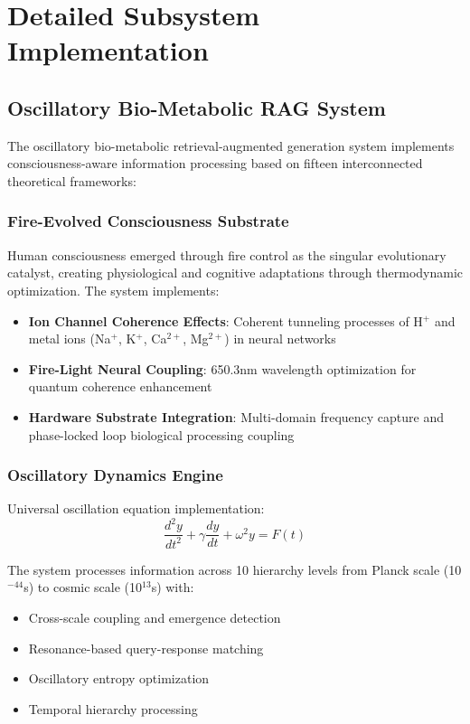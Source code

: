 \documentclass[11pt,a4paper]{article}
\begin{document}
\section{Detailed Subsystem Implementation}

\subsection{Oscillatory Bio-Metabolic RAG System}

The oscillatory bio-metabolic retrieval-augmented generation system implements consciousness-aware information processing based on fifteen interconnected theoretical frameworks:

\subsubsection{Fire-Evolved Consciousness Substrate}

Human consciousness emerged through fire control as the singular evolutionary catalyst, creating physiological and cognitive adaptations through thermodynamic optimization. The system implements:

\begin{itemize}
\item \textbf{Ion Channel Coherence Effects}: Coherent tunneling processes of H$^+$ and metal ions (Na$^+$, K$^+$, Ca$^{2+}$, Mg$^{2+}$) in neural networks
\item \textbf{Fire-Light Neural Coupling}: 650.3nm wavelength optimization for quantum coherence enhancement
\item \textbf{Hardware Substrate Integration}: Multi-domain frequency capture and phase-locked loop biological processing coupling
\end{itemize}

\subsubsection{Oscillatory Dynamics Engine}

Universal oscillation equation implementation:
\begin{equation}
\frac{d^2y}{dt^2} + \gamma\frac{dy}{dt} + \omega^2y = F(t)
\end{equation}

The system processes information across 10 hierarchy levels from Planck scale (10$^{-44}$s) to cosmic scale (10$^{13}$s) with:
\begin{itemize}
\item Cross-scale coupling and emergence detection
\item Resonance-based query-response matching  
\item Oscillatory entropy optimization
\item Temporal hierarchy processing
\end{itemize}
\end{document}
